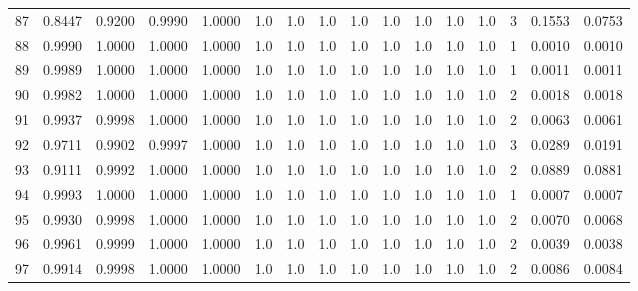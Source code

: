 \begin{tabular}{lrrrrrrrrrrrrrrr}
87  &      0.8447 &  0.9200 &  0.9990 &  1.0000 &     1.0 &     1.0 &     1.0 &     1.0 &     1.0 &     1.0 &      1.0 &        1.0 &      3 &                    0.1553 &                     0.0753 \\
88  &      0.9990 &  1.0000 &  1.0000 &  1.0000 &     1.0 &     1.0 &     1.0 &     1.0 &     1.0 &     1.0 &      1.0 &        1.0 &      1 &                    0.0010 &                     0.0010 \\
89  &      0.9989 &  1.0000 &  1.0000 &  1.0000 &     1.0 &     1.0 &     1.0 &     1.0 &     1.0 &     1.0 &      1.0 &        1.0 &      1 &                    0.0011 &                     0.0011 \\
90  &      0.9982 &  1.0000 &  1.0000 &  1.0000 &     1.0 &     1.0 &     1.0 &     1.0 &     1.0 &     1.0 &      1.0 &        1.0 &      2 &                    0.0018 &                     0.0018 \\
91  &      0.9937 &  0.9998 &  1.0000 &  1.0000 &     1.0 &     1.0 &     1.0 &     1.0 &     1.0 &     1.0 &      1.0 &        1.0 &      2 &                    0.0063 &                     0.0061 \\
92  &      0.9711 &  0.9902 &  0.9997 &  1.0000 &     1.0 &     1.0 &     1.0 &     1.0 &     1.0 &     1.0 &      1.0 &        1.0 &      3 &                    0.0289 &                     0.0191 \\
93  &      0.9111 &  0.9992 &  1.0000 &  1.0000 &     1.0 &     1.0 &     1.0 &     1.0 &     1.0 &     1.0 &      1.0 &        1.0 &      2 &                    0.0889 &                     0.0881 \\
94  &      0.9993 &  1.0000 &  1.0000 &  1.0000 &     1.0 &     1.0 &     1.0 &     1.0 &     1.0 &     1.0 &      1.0 &        1.0 &      1 &                    0.0007 &                     0.0007 \\
95  &      0.9930 &  0.9998 &  1.0000 &  1.0000 &     1.0 &     1.0 &     1.0 &     1.0 &     1.0 &     1.0 &      1.0 &        1.0 &      2 &                    0.0070 &                     0.0068 \\
96  &      0.9961 &  0.9999 &  1.0000 &  1.0000 &     1.0 &     1.0 &     1.0 &     1.0 &     1.0 &     1.0 &      1.0 &        1.0 &      2 &                    0.0039 &                     0.0038 \\
97  &      0.9914 &  0.9998 &  1.0000 &  1.0000 &     1.0 &     1.0 &     1.0 &     1.0 &     1.0 &     1.0 &      1.0 &        1.0 &      2 &                    0.0086 &                     0.0084 \\

\end{tabular}
